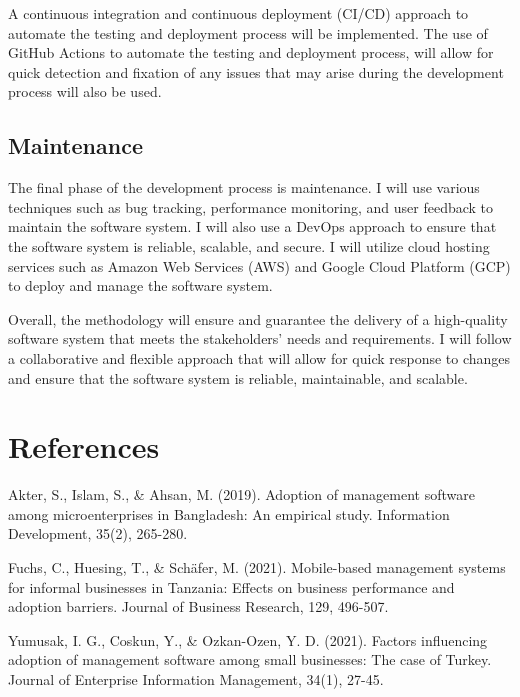 \documentclass{article}
\begin{document}
A continuous integration and continuous deployment (CI/CD) approach to automate the testing and deployment process  will be implemented. The use of GitHub Actions to automate the testing and deployment process, will allow for quick detection and fixation of any issues that may arise during the development process will also be used.

\subsection{Maintenance}

The final phase of the development process is maintenance. I will use various techniques such as bug tracking, performance monitoring, and user feedback to maintain the software system. I will also use a DevOps approach to ensure that the software system is reliable, scalable, and secure. I will utilize cloud hosting services such as Amazon Web Services (AWS) and Google Cloud Platform (GCP) to deploy and manage the software system.

Overall, the methodology will ensure and guarantee the delivery of a high-quality software system that meets the stakeholders' needs and requirements. I will follow a collaborative and flexible approach that will allow for quick response to changes and ensure that the software system is reliable, maintainable, and scalable.

\newpage


\section{References}
\renewcommand{\refname}{}
\begin{thebibliography}{10}
	
	Akter, S., Islam, S., \& Ahsan, M. (2019). Adoption of management software among microenterprises in Bangladesh: An empirical study. Information Development, 35(2), 265-280.

	Fuchs, C., Huesing, T., \& Schäfer, M. (2021). Mobile-based management systems for informal businesses in Tanzania: Effects on business performance and adoption barriers. Journal of Business Research, 129, 496-507.

	Yumusak, I. G., Coskun, Y., \& Ozkan-Ozen, Y. D. (2021). Factors influencing adoption of management software among small businesses: The case of Turkey. Journal of Enterprise Information Management, 34(1), 27-45.

\end{thebibliography}
\end{document}
